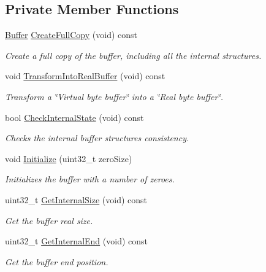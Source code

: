 \subsection*{Private Member Functions}
\begin{DoxyCompactItemize}
\item 
\hyperlink{classns3_1_1Buffer}{Buffer} \hyperlink{classns3_1_1Buffer_a8dd09a348caee9051b2aa3a154ab09e5}{Create\+Full\+Copy} (void) const 
\begin{DoxyCompactList}\small\item\em Create a full copy of the buffer, including all the internal structures. \end{DoxyCompactList}\item 
void \hyperlink{classns3_1_1Buffer_a37f603a90d9e7ddfef36f1301cc9d8b6}{Transform\+Into\+Real\+Buffer} (void) const 
\begin{DoxyCompactList}\small\item\em Transform a \char`\"{}\+Virtual byte buffer\char`\"{} into a \char`\"{}\+Real byte buffer\char`\"{}. \end{DoxyCompactList}\item 
bool \hyperlink{classns3_1_1Buffer_a6202ce7f1ecc1fc7a14cc13017375d14}{Check\+Internal\+State} (void) const 
\begin{DoxyCompactList}\small\item\em Checks the internal buffer structures consistency. \end{DoxyCompactList}\item 
void \hyperlink{classns3_1_1Buffer_ac8eb4126519c379546a52035c4d5f6f4}{Initialize} (uint32\+\_\+t zero\+Size)
\begin{DoxyCompactList}\small\item\em Initializes the buffer with a number of zeroes. \end{DoxyCompactList}\item 
uint32\+\_\+t \hyperlink{classns3_1_1Buffer_ac362d096b53b9f266eba487495120942}{Get\+Internal\+Size} (void) const 
\begin{DoxyCompactList}\small\item\em Get the buffer real size. \end{DoxyCompactList}\item 
uint32\+\_\+t \hyperlink{classns3_1_1Buffer_a2793d327c30b626594b52047b8ec16ab}{Get\+Internal\+End} (void) const 
\begin{DoxyCompactList}\small\item\em Get the buffer end position. \end{DoxyCompactList}\end{DoxyCompactItemize}
